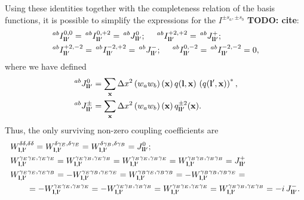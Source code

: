 \documentclass[a4paper,11pt]{article}
\newcommand{\todo}[1]{{\bf TODO: #1}}
\newcommand{\summ}[1]{\sum_{\bf #1}\Delta #1^2}
\begin{document}
    Using these identities together with the completeness relation of the basis functions, it is possible to simplify the expressions for the $I^{\pm s_a,\pm s_b}$ \todo{cite}:
    \begin{align}
      &\,^{ab}I^{0,0}_{{\bf l}{\bf l}'}=\,^{ab}I^{0,+2}_{{\bf l}{\bf l}'}=\,^{ab}J^0_{{\bf l}{\bf l}'}; \hspace{12pt}
      \,^{ab}I^{+2,+2}_{{\bf l}{\bf l}'}=\,^{ab}J^+_{{\bf l}{\bf l}'};\\
      &\,^{ab}I^{+2,-2}_{{\bf l}{\bf l}'}=\,^{ab}I^{-2,+2}_{{\bf l}{\bf l}'}=\,^{ab}J^-_{{\bf l}{\bf l}'}; \hspace{12pt}
      \,^{ab}I^{0,-2}_{{\bf l}{\bf l}'}=\,^{ab}I^{-2,-2}_{{\bf l}{\bf l}'}=0,
    \end{align}
    where  we have defined
    \begin{align}\label{eq:covar_coupling_J}
      &\,^{ab}J^0_{{\bf l}{\bf l}'}=\summ{x}\left(w_a w_b\right)({\bf x})\,q({\bf l},{\bf x})\,\left(q({\bf l}',{\bf x})\right)^*,\\
      &\,^{ab}J^\pm_{{\bf l}{\bf l}'}=\summ{x}\left(w_a w_b\right)({\bf x})\,q^{\pm2}_{{\bf l}{\bf l}'}({\bf x}).
    \end{align}
    Thus, the only surviving non-zero coupling coefficients are
    \begin{align}
      &W^{\delta\delta,\delta\delta}_{{\bf l},{\bf l}'}=W^{\delta\gamma_E,\delta\gamma_E}_{{\bf l},{\bf l}'}=W^{\delta\gamma_B,\delta\gamma_B}_{{\bf l},{\bf l}'}=J^0_{{\bf l}{\bf l}'};\\
      &W^{\gamma_E\gamma_E,\gamma_E\gamma_E}_{{\bf l},{\bf l}'}=W^{\gamma_E\gamma_B,\gamma_E\gamma_B}_{{\bf l},{\bf l}'}=W^{\gamma_B\gamma_E,\gamma_B\gamma_E}_{{\bf l},{\bf l}'}=W^{\gamma_B\gamma_B,\gamma_B\gamma_B}_{{\bf l},{\bf l}'}=J^+_{{\bf l}{\bf l}'}\\\nonumber
      &W^{\gamma_E\gamma_E,\gamma_E\gamma_B}_{{\bf l},{\bf l}'}=-W^{\gamma_E\gamma_B,\gamma_E\gamma_E}_{{\bf l},{\bf l}'}=W^{\gamma_B\gamma_E,\gamma_B\gamma_B}_{{\bf l},{\bf l}'}=-W^{\gamma_B\gamma_B,\gamma_B\gamma_E}_{{\bf l},{\bf l}'}=\\
      &\hspace{20pt}=-W^{\gamma_E\gamma_E,\gamma_B\gamma_E}_{{\bf l},{\bf l}'}=-W^{\gamma_E\gamma_B,\gamma_B\gamma_B}_{{\bf l},{\bf l}'}=W^{\gamma_B\gamma_E,\gamma_E\gamma_E}_{{\bf l},{\bf l}'}=W^{\gamma_B\gamma_B,\gamma_E\gamma_B}_{{\bf l},{\bf l}'}=-i\,J^-_{{\bf l}{\bf l}'}.
    \end{align}
    
\end{document}
